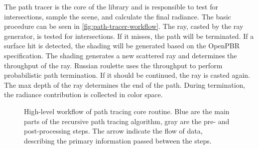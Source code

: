 The path tracer is the core of the library and is responsible to test for intersections, sample the scene, and calculate the final radiance. The basic procedure can be seen in \autoref{fig:path-tracer-workflow}. The ray, casted by the ray generator, is tested for intersections. If it misses, the path will be terminated. If a surface hit is detected, the shading will be generated based on the \gls{OpenPBR} specification. The shading generates a new scattered ray and determines the throughput of the ray. Russian roulette uses the throughput to perform probabilistic path termination. If it should be continued, the ray is casted again. The max depth of the ray determines the end of the path. During termination, the radiance contribution is collected in  color space.

\begin{figure}[H]
    \centering
    \caption{High-level workflow of path tracing core routine. Blue are the main parts of the recursive path tracing algorithm, gray are the pre- and post-processing steps. The arrow indicate the flow of data, describing the primary information passed between the steps.}
    \label{fig:path-tracer-workflow}
  \end{figure}

